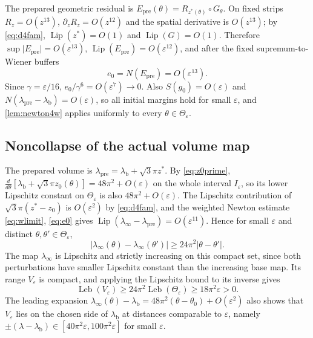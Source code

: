 \documentclass[11pt]{amsart}
\numberwithin{equation}{section}
\theoremstyle{definition}
\theoremstyle{remark}
\newcommand{\eps}{\varepsilon}
\newcommand{\abs}[1]{\lvert #1\rvert}
\newcommand{\Lip}{\operatorname{Lip}}
\newcommand{\Leb}{\operatorname{Leb}}
\newcommand{\lb}{\lambda_{\mathrm b}}
\begin{document}
The prepared geometric residual is $E_{\mathrm{pre}}(\theta)=R_{z^*(\theta)}\circ G_\theta$. On fixed strips $R_z=O(z^{13})$, $\partial_zR_z=O(z^{12})$ and the spatial derivative is $O(z^{13})$; by \eqref{eq:d4fam}, $\Lip(z^*)=O(1)$ and $\Lip(G)=O(1)$. Therefore $\sup\abs{E_{\mathrm{pre}}}=O(\eps^{13})$, $\Lip(E_{\mathrm{pre}})=O(\eps^{12})$, and after the fixed supremum-to-Wiener buffers
\begin{equation}\label{eq:e0}
e_0=N(E_{\mathrm{pre}})=O(\eps^{13}).
\end{equation}
Since $\gamma=\eps/16$, $e_0/\gamma^6=O(\eps^7)\to0$. Also $S(g_0)=O(\eps)$ and $N(\lambda_{\mathrm{pre}}-\lb)=O(\eps)$, so all initial margins hold for small $\eps$, and \cref{lem:newton4w} applies uniformly to every $\theta\in\Theta_\eps$.

\subsection{Noncollapse of the actual volume map}\label{sec:d4noncollapse}
The prepared volume is $\lambda_{\mathrm{pre}}=\lb+\sqrt3\pi z^*$. By \eqref{eq:z0prime}, $\frac d{d\theta}[\lb+\sqrt3\pi z_0(\theta)]=48\pi^2+O(\eps)$ on the whole interval $I_\eps$, so its lower Lipschitz constant on $\Theta_\eps$ is also $48\pi^2+O(\eps)$. The Lipschitz contribution of $\sqrt3\pi(z^*-z_0)$ is $O(\eps^2)$ by \eqref{eq:d4fam}, and the weighted Newton estimate \eqref{eq:wlimit}, \eqref{eq:e0} gives $\Lip(\lambda_\infty-\lambda_{\mathrm{pre}})=O(\eps^{11})$. Hence for small $\eps$ and distinct $\theta,\theta'\in\Theta_\eps$,
\begin{equation}\label{eq:noncollapse}
\abs{\lambda_\infty(\theta)-\lambda_\infty(\theta')}\ge24\pi^2\abs{\theta-\theta'}.
\end{equation}
The map $\lambda_\infty$ is Lipschitz and strictly increasing on this compact set, since both perturbations have smaller Lipschitz constant than the increasing base map. Its range $V_\eps$ is compact, and applying the Lipschitz bound to its inverse gives
\begin{equation}\label{eq:Vmeasure}
\Leb(V_\eps)\ge24\pi^2\Leb(\Theta_\eps)\ge18\pi^2\eps>0.
\end{equation}
The leading expansion $\lambda_\infty(\theta)-\lb=48\pi^2(\theta-\theta_0)+O(\eps^2)$ also shows that $V_\eps$ lies on the chosen side of $\lb$ at distances comparable to $\eps$, namely $\pm(\lambda-\lb)\in[40\pi^2\eps,100\pi^2\eps]$ for small $\eps$.
\end{document}
